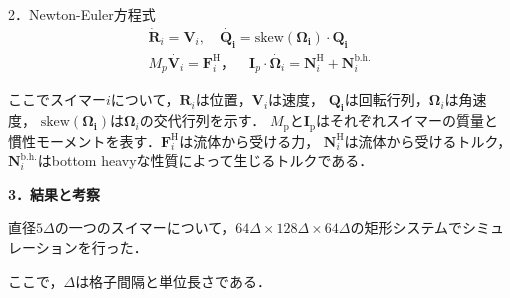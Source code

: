 \documentclass[twocolumns,10pt,a4j]{jarticle}
\begin{document}
  \par
2．Newton-Euler方程式\\
  \vspace{-6truemm}
  \begin{equation}
    \begin{split}
      \dot{\boldsymbol{R}}_i = \boldsymbol{V}_i, \quad \boldsymbol{\dot{Q_i}} = \mathrm{skew} (\boldsymbol{\Omega_i}) \cdot \boldsymbol{Q_i} \\
      M_p \dot{\boldsymbol{V}_i} = \boldsymbol{F}_i^\mathrm{H}， \quad
      \boldsymbol{I}_p \cdot \dot{\boldsymbol{\Omega}_i} = \boldsymbol{N}_i^\mathrm{H} + \boldsymbol{N}_i^\mathrm{b.h.}
    \end{split}
    \label{Newton_Euler}
  \end{equation}
  \vspace{-4truemm}

  \noindent
ここでスイマー$i$について，$\boldsymbol{R}_i$は位置，$\boldsymbol{V}_i$は速度，
$\boldsymbol{Q_i}$は回転行列，$\boldsymbol{\Omega}_i$は角速度，
$\mathrm{skew} (\boldsymbol{\Omega_i})$は$\boldsymbol{\Omega}_i$の交代行列を示す．
$M_\mathrm{p}$と$\boldsymbol{I}_\mathrm{p}$はそれぞれスイマーの質量と慣性モーメントを表す．$\boldsymbol{F}_i^\mathrm{H}$は流体から受ける力，
$\boldsymbol{N}_i^\mathrm{H}$は流体から受けるトルク，$\boldsymbol{N}_i^\mathrm{b.h.}$はbottom heavyな性質によって生じるトルクである．


  \noindent
  {\bf \large 3．結果と考察}
  \par
直径$5\Delta$の一つのスイマーについて，$64\Delta \times 128\Delta \times 64\Delta$の矩形システムでシミュレーションを行った．

ここで，$\Delta$は格子間隔と単位長さである．

\end{document}
